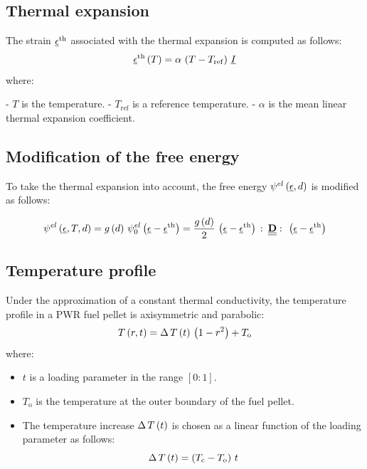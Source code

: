 \subsection{Thermal expansion}

The strain \(\underline{\epsilon}^{\mathrm{th}}\) associated with the thermal expansion is
computed as follows:
\[
\underline{\epsilon}^{\mathrm{th}}\left(T\right)=\alpha\,\left(T-T_{\mathrm{ref}}\right)\,\underline{I}
\]
where:

- \(T\) is the temperature.
- \(T_{\mathrm{ref}}\) is a reference temperature.
- \(\alpha\) is the mean linear thermal expansion coefficient.

\subsection{Modification of the free energy}

To take the thermal expansion into account, the free energy
\({\psi}^{el}\left(\underline{\epsilon}, d\right)\) is modified as follows:

\begin{equation}
  \label{eq:micromorphicdamage:freeenergygel_2}
  {\psi}^{el}\left(\underline{\epsilon}, T, d\right) = 
  g\left(d\right)\,{\psi}^{el}_{0}\left(\underline{\epsilon}-\underline{\epsilon}^{\mathrm{th}}\right) =
  \displaystyle \frac{\displaystyle g\left(d\right)}{\displaystyle 2}\,\left(\underline{\epsilon}-\underline{\epsilon}^{\mathrm{th}}\right)\,\colon\,\underline{\underline{\mathbf{D}}}\,\colon\,\left(\underline{\epsilon}-\underline{\epsilon}^{\mathrm{th}}\right)
\end{equation}


\subsection{Temperature profile}

Under the approximation of a constant thermal conductivity, the
temperature profile in a PWR fuel pellet is axisymmetric and parabolic:
\[
T\left(r, t\right)=\Delta\,T\left(t\right)\,\left(1-r^{2}\right)+T_{\mathrm{o}}
\]
where:

\begin{itemize}
  \item \(t\) is a loading parameter in the range \([0:1]\).
  \item \(T_{\mathrm{o}}\) is the temperature at the outer boundary of the
    fuel pellet.
  \item The temperature increase \(\Delta\,T\left(t\right)\) is chosen as a linear
    function of the loading parameter as follows:
    \[
    \Delta\,T\left(t\right) = \left(T_{\mathrm{c}}-T_{\mathrm{o}}\right)\, t
    \]
\end{itemize}

